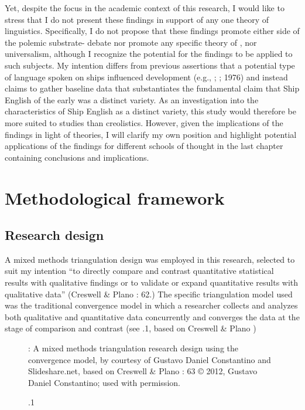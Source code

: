 Yet, despite the  focus in the academic context of this research, I would like to stress that I do not present these findings in support of any one theory of  linguistics. Specifically, I do not propose that these findings promote either side of the polemic substrate- debate nor promote any specific theory of ,  nor universalism, although I recognize the potential for the findings to be applied to such subjects. My intention differs from previous assertions that a potential type of language spoken on ships influenced  development (e.g., \citealt{Reinecke1938}; \citealt{Hancock1972}; 1976) and instead claims to gather baseline data that substantiates the fundamental claim that Ship English of the early  was a distinct variety. As an investigation into the characteristics of Ship English as a distinct variety, this study would therefore be more suited to  studies than creolistics. However, given the implications of the findings in light of  theories, I will clarify my own position and highlight potential applications of the findings for different schools of thought in the last chapter containing conclusions and implications. 



\section{{Methodological} {framework}}%



\subsection{{Research} {design}}%



A mixed methods triangulation design was employed in this research, selected to suit my intention “to directly compare and contrast quantitative statistical results with qualitative findings or to validate or expand quantitative results with qualitative data” (Creswell \& Plano \citealt{Clark2007}: 62.) The specific triangulation model used was the traditional convergence model in which a researcher collects and analyzes both qualitative and quantitative data concurrently and converges the data at the stage of comparison and contrast (see .1, based on Creswell \& Plano \citealt{Clark2007})


\begin{figure}
 

\caption{\label{fig:key:1}.1}: A mixed methods triangulation research design using the convergence model, by courtesy of Gustavo Daniel Constantino and Slideshare.net, based on Creswell \& Plano \citealt{Clark2007}: 63 © 2012, Gustavo Daniel Constantino; used with permission. 
\end{figure}



